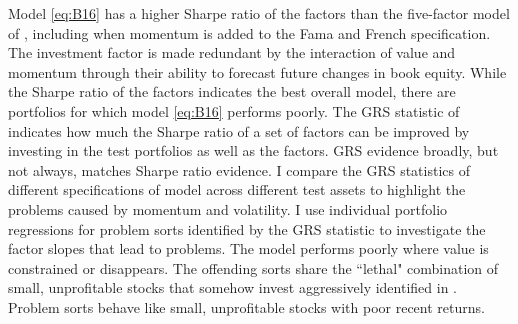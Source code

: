 Model \ref{eq:B16} has a higher Sharpe ratio of the factors than the
five-factor model of \textcite{fama2015five}, including when momentum is added
to the Fama and French specification.
The investment factor is made redundant by the interaction of value and
momentum through their ability to forecast future changes in book equity.
While the Sharpe ratio of the factors indicates the best overall model,
there are portfolios for which model \ref{eq:B16} performs poorly.
The GRS statistic of \textcite{gibbons1989test} indicates how much the Sharpe
ratio of a set of factors can be improved by investing in the test portfolios
as well as the factors.
GRS evidence broadly, but not always, matches Sharpe ratio evidence.
I compare the GRS statistics of different specifications of model across
different test assets to highlight the problems caused by momentum and
volatility.
I use individual portfolio regressions for problem sorts identified by the GRS
statistic to investigate the factor slopes that lead to problems.
The model performs poorly where value is constrained or disappears.
The offending sorts share the ``lethal" combination of small, unprofitable
stocks that somehow invest aggressively identified in
\textcite{fama2015five, fama2016dissecting}.
Problem sorts behave like small, unprofitable stocks with poor recent returns.
